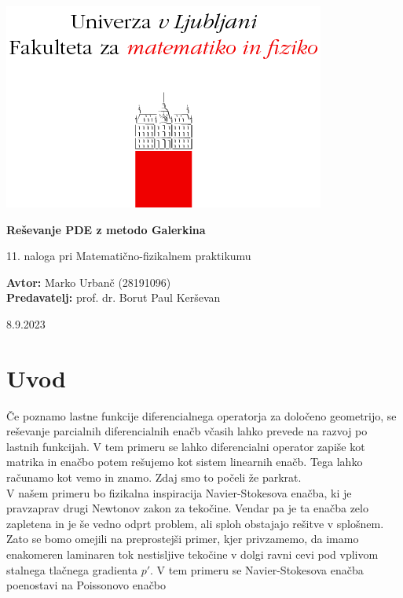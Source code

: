 \documentclass[a4paper]{article}
\begin{document}
\begin{titlepage}
    \begin{center}
        \includegraphics[]{logo.png}
        \vspace*{3cm}
        
        \Huge
        \textbf{Reševanje PDE z metodo Galerkina}
        
        \vspace{0.5cm}
        \large
        11. naloga pri Matematično-fizikalnem praktikumu

        \vspace{4.5cm}
        
        \textbf{Avtor:} Marko Urbanč (28191096)\ \\
        \textbf{Predavatelj:} prof. dr. Borut Paul Kerševan\ \\
        
        \vspace{2.8cm}
        
        \large
        8.9.2023
    \end{center}
\end{titlepage}
\tableofcontents
\newpage
\section{Uvod}
Če poznamo lastne funkcije diferencialnega operatorja za določeno geometrijo, se reševanje parcialnih
diferencialnih enačb včasih lahko prevede na razvoj po lastnih funkcijah. V tem primeru se lahko
diferencialni operator zapiše kot matrika in enačbo potem rešujemo kot sistem linearnih enačb. Tega lahko
računamo kot vemo in znamo. Zdaj smo to počeli že parkrat.\\

V našem primeru bo fizikalna inspiracija Navier-Stokesova enačba, ki je pravzaprav drugi Newtonov zakon za 
tekočine. Vendar pa je ta enačba zelo zapletena in je še vedno odprt problem, ali sploh obstajajo rešitve
v splošnem. Zato se bomo omejili na preprostejši primer, kjer privzamemo, da imamo enakomeren laminaren tok 
nestisljive tekočine v dolgi ravni cevi pod vplivom stalnega tlačnega gradienta $p'$. V tem primeru se 
Navier-Stokesova enačba poenostavi na Poissonovo enačbo
\end{document}

